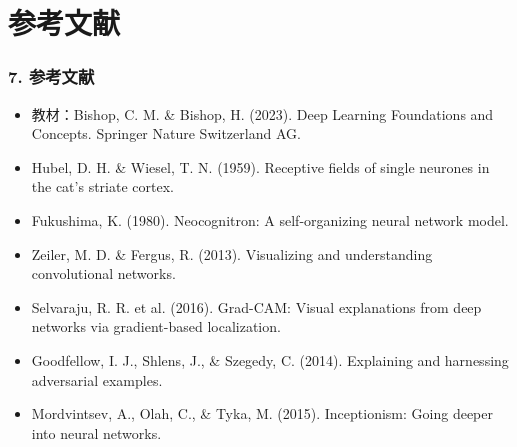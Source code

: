\documentclass[t,aspectratio=169]{beamer} %
\begin{document}
\section{参考文献}

\begin{frame}
    \frametitle{7. 参考文献}
    \begin{itemize}
        \item 教材：Bishop, C. M. \& Bishop, H. (2023). Deep Learning Foundations and Concepts. Springer Nature Switzerland AG.
        \item Hubel, D. H. \& Wiesel, T. N. (1959). Receptive fields of single neurones in the cat's striate cortex.
        \item Fukushima, K. (1980). Neocognitron: A self-organizing neural network model.
        \item Zeiler, M. D. \& Fergus, R. (2013). Visualizing and understanding convolutional networks.
        \item Selvaraju, R. R. et al. (2016). Grad-CAM: Visual explanations from deep networks via gradient-based localization.
        \item Goodfellow, I. J., Shlens, J., \& Szegedy, C. (2014). Explaining and harnessing adversarial examples.
        \item Mordvintsev, A., Olah, C., \& Tyka, M. (2015). Inceptionism: Going deeper into neural networks.
    \end{itemize}
\end{frame}
\end{document}
